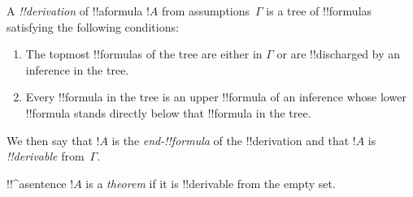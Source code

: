 \documentclass[../../../include/open-logic-section]{subfiles}
\begin{document}
\begin{defn}[!!^{derivation}]
A \emph{!!{derivation}} of !!a{formula} $!A$ from assumptions~$\Gamma$
is a tree of !!{formula}s satisfying the following conditions:
\begin{enumerate}
\item The topmost !!{formula}s of the tree are either in $\Gamma$ or
  are !!{discharged} by an inference in the tree.
\item Every !!{formula} in the tree is an upper !!{formula} of an
  inference whose lower !!{formula} stands directly below that !!{formula} in
  the tree.
\end{enumerate}
We then say that $!A$ is the \emph{end-!!{formula}} of the
!!{derivation} and that $!A$ is \emph{!!{derivable}} from~$\Gamma$.
\end{defn}

\begin{defn}[Theorem]
!!^a{sentence} $!A$ is a \emph{theorem} if it is !!{derivable}
from the empty set.
\end{defn}
\end{document}
